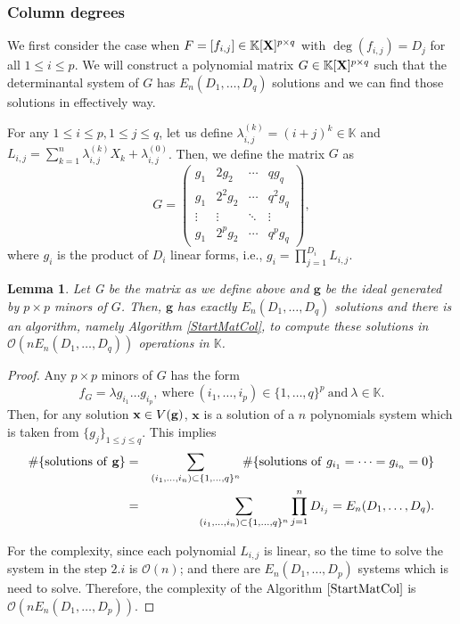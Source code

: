 \documentclass[11pt]{article}
\numberwithin{Property}{section}
\numberwithin{Theorem}{section}
\numberwithin{Proposition}{section}
\newtheorem{Lemma}{Lemma}%
\numberwithin{Lemma}{section}
\numberwithin{Corollary}{section}
\numberwithin{Definition}{section}
\numberwithin{Remark}{section}
\numberwithin{Conjecture}{section}
\numberwithin{Problem}{section}
\numberwithin{Claim}{section}
\theoremstyle{definition}
\numberwithin{Example}{section}
\def\g {\ensuremath{\mathbf{g}}}
\renewcommand{\leq}{\leqslant}
\newcommand{\bigO}[1]{\mathcal{O}(#1)} %
\newcommand{\field}{\mathbb{K}} %
\newcommand{\mat}[1]{\mathbf{\MakeUppercase{#1}}} %
\begin{document}
\subsubsection{Column degrees}
\label{subsec:cd}
We first consider the case when $F = [f_{i,j}] \in \field[\mat{X}]^{p\times q}$ with $\deg({f_{i,j}}) = D_j$ for all $1 \leq i \leq p$. We will construct a polynomial matrix $G \in \field[\mat{X}]^{p \times q}$ such that the determinantal system of $G$ has $E_{n}(D_1, \ldots, D_q)$ solutions and we can find those solutions in effectively way. 

For any $1 \leq i \leq p, 1 \leq j \leq q$, let us define $\lambda_{i,j}^{(k)}  = (i+j)^k \in \field$ and $L_{i,j} = \sum_{k = 1}^{n}\lambda_{i,j}^{(k)}X_k + \lambda_{i,j}^{(0)}$. Then, we define the matrix $G$ as
\[G = 
\left( \begin{matrix}
g_1 & 2g_2 & \cdots & qg_{q}\\
g_1 & 2^2g_2 & \cdots & q^2g_q\\
\vdots & \vdots & \ddots & \vdots \\
g_1 & 2^pg_2 & \cdots & q^pg_q
\end{matrix} \right),
\]
where $g_{i}$ is the product of $D_i$ linear forms, i.e., $g_i = \prod_{j = 1}^{D_i}L_{i,j}$. 
\begin{Lemma} \label{G} Let G be the matrix as we define above and $\g$ be the ideal generated by $p \times p$ minors of $G$. Then, $\g$ has exactly $E_{n}(D_1, \ldots, D_q)$ solutions and there is an algorithm, namely Algorithm \ref{StartMatCol}, to compute these solutions in $\bigO{nE_{n}(D_1, \ldots, D_q)}$ operations in $\field$.
\end{Lemma}
\begin{proof}
Any $p \times p$ minors of $G$ has the form 
\[
f_G = \lambda g_{i_1}\ldots g_{i_p}, \ \mathrm{where} \ (i_1, \ldots, i_p) \in \{1, \ldots,q\}^{p} \ \mathrm{and} \ \lambda \in \field.
\] Then, for any solution $\mathbf{x} \in V({\bf g})$, $\mathbf{x}$ is a solution of a $n$ polynomials system which is taken from $\{g_j\}_{1 \leq j \leq q}$. This implies 
\begin{eqnarray*}
\#\{\mathrm{solutions \ of \ } {\bf g} \} &=& \sum_{(i_1, \ldots, i_{n}) \subset \{1, \ldots,q\}^{n}} \#
\{\mathrm{solutions \ of \ }  g_{i_1} = \cdots = g_{i_{n}} = 0  \} \\
&=& \sum_{(i_1, \ldots, i_{n}) \subset \{1, \ldots,q\}^{n}}\prod_{j =1}^{n}D_{i_j} = E_{n}(D_1, \ldots, D_q). 
\end{eqnarray*}

For the complexity, since each polynomial $L_{i,j}$ is linear, so the time to solve the system in the step $2.i$ is $\bigO{n}$; and there are $E_{n}(D_1, \ldots, D_p)$ systems which is need to solve. Therefore, the complexity of the Algorithm $\ref{StartMatCol}$ is $\bigO{nE_{n}(D_1, \ldots, D_p)}$.
\end{proof}
\end{document}
